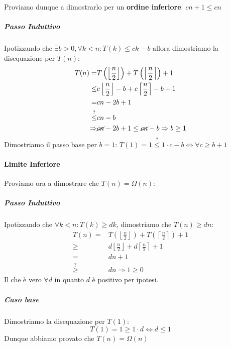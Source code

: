                 Proviamo dunque a dimostrarlo per un \textbf{ordine inferiore}: $ cn+1\leq cn $
                \subparagraph{Passo Induttivo} Ipotizzando che $ \exists b>0,\forall k<n:T(k)\leq ck-b $ allora dimostriamo la disequazione per $T(n)$:
                    $$
                        \begin{aligned}
                            T(n)=&T\left(\left\lfloor\frac{n}2\right\rfloor\right) + T\left(\left\lceil\frac{n}2\right\rceil\right) + 1 \\
                            \leq & c\left\lfloor\frac{n}2\right\rfloor - b + c\left\lceil\frac{n}2\right\rceil - b + 1 \\
                            =& cn - 2b + 1 \\
                            \stackrel{?}{\leq} & cn - b \\
                            \Rightarrow & \cancel{cn} - 2b + 1 \leq \cancel{cn} - b \Rightarrow b\geq 1
                        \end{aligned}
                    $$
                    Dimostriamo il passo base per $ b=1 $: $ T(1) = 1 \stackrel{?}{\leq} 1\cdot c - b\Leftrightarrow \forall c\geq b+1 $
            \paragraph{Limite Inferiore} 
                Proviamo ora a dimostrare che $ T(n) = \Omega(n) $:
                \subparagraph{Passo Induttivo} Ipotizzando che $ \forall k<n:T(k)\geq dk $, dimostriamo che $ T(n)\geq dn $:
                    $$
                        \begin{aligned}
                            T(n)=&T\left(\left\lfloor\frac{n}2\right\rfloor\right) + T\left(\left\lceil\frac{n}2\right\rceil\right) + 1 \\
                            \geq & d\left\lfloor\frac{n}2\right\rfloor + d\left\lceil\frac{n}2\right\rceil + 1 \\
                            = & dn + 1 \\
                            \stackrel{?}{\geq} & dn \Rightarrow 1\geq 0 
                        \end{aligned}
                    $$ Il che è vero $ \forall d $ in quanto $ d $ è positivo per ipotesi.
                \subparagraph{Caso base} Dimostriamo la disequazione per $ T(1) $:
                    $$
                        T(1) = 1 \geq 1\cdot d \Leftrightarrow d\leq 1
                    $$Dunque abbiamo provato che $ T(n) = \Omega(n) $

